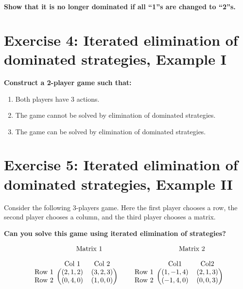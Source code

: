 \documentclass[10pt]{article}
\begin{document}
\textbf{Show that it is no longer dominated if all ``1''s are changed to ``2''s.}

\section*{Exercise 4: Iterated elimination of dominated strategies, Example I}

\textbf{Construct a 2-player game such that:}

\begin{enumerate}
    \item Both players have 3 actions.
    \item The game cannot be solved by elimination of dominated strategies.
    \item The game can be solved by elimination of dominated strategies.
\end{enumerate}

\section*{Exercise 5: Iterated elimination of dominated strategies, Example II}
Consider the following 3-players game. Here the first player chooses a row,
the second player chooses a column, and the third player chooses a matrix.

\textbf{Can you solve this game using iterated elimination of strategies?}

\begin{equation*}
\begin{blockarray}{ccc}
    & \BAmulticolumn{2}{c}{\text{Matrix } 1} \\ [1em]
    & \text{Col } 1 & \text{Col } 2 \\
    \begin{block}{c(cc)}
        \text{Row } 1 & (2, 1, 2) & (3, 2, 3) \\
        \text{Row } 2 & (0, 4, 0) & (1, 0, 0) \\
    \end{block}
\end{blockarray}\qquad
%
\begin{blockarray}{ccc}
    & \BAmulticolumn{2}{c}{\text{Matrix } 2} \\ [1em]
    & \text{Col} 1 & \text{Col} 2 \\
    \begin{block}{c(cc)}
        \text{Row } 1 & (1, -1, 4) & (2, 1, 3) \\
        \text{Row } 2 & (-1, 4, 0) & (0, 0, 3) \\
    \end{block}
\end{blockarray}
\end{equation*}
\end{document}

